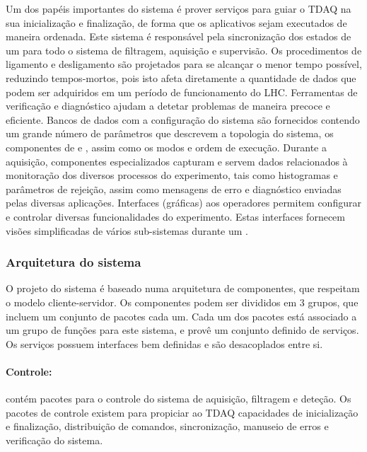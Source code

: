 Um dos papéis importantes do sistema  é prover serviços para guiar
o TDAQ na sua inicialização e finalização, de forma que os aplicativos sejam
executados de maneira ordenada. Este sistema é responsável pela sincronização
dos estados de um  para todo o sistema de filtragem, aquisição e
supervisão. Os procedimentos de ligamento e desligamento são projetados para
se alcançar o menor tempo possível, reduzindo tempos-mortos, pois isto afeta
diretamente a quantidade de dados que podem ser adquiridos em um período de
funcionamento do LHC. Ferramentas de verificação e diagnóstico ajudam a
detetar problemas de maneira precoce e eficiente. Bancos de dados com a
configuração do sistema são fornecidos contendo um grande número de parâmetros
que descrevem a topologia do sistema, os componentes de
 e , assim como os modos e ordem de
execução. Durante a aquisição, componentes especializados capturam e servem
dados relacionados à monitoração dos diversos processos do experimento, tais
como histogramas e parâmetros de rejeição, assim como mensagens de erro e
diagnóstico enviadas pelas diversas aplicações. Interfaces (gráficas) aos
operadores permitem configurar e controlar diversas funcionalidades do
experimento. Estas interfaces fornecem visões simplificadas de vários
sub-sistemas durante um .

\subsubsection{Arquitetura do sistema }
\label{sec:online-arch}

O projeto do sistema  é baseado numa arquitetura de componentes,
que respeitam o modelo cliente-servidor. Os componentes podem ser divididos em 3
grupos, que incluem um conjunto de pacotes cada um. Cada um dos pacotes está
associado a um grupo de funções para este sistema, e provê um conjunto definido
de serviços. Os serviços possuem interfaces bem definidas e são desacoplados
entre si.

\paragraph{Controle:} contém pacotes para o controle do sistema de
aquisição, filtragem e deteção. Os pacotes de controle existem para propiciar
ao TDAQ capacidades de inicialização e finalização, distribuição de comandos,
sincronização, manuseio de erros e verificação do sistema.

